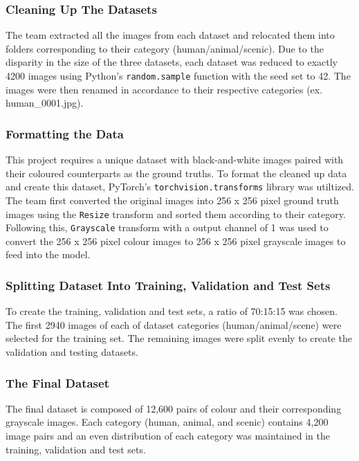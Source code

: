 \documentclass{article} %
\begin{document}
\subsubsection{Cleaning Up The Datasets}
The team extracted all the images from each dataset and relocated them into folders corresponding to their category (human/animal/scenic). Due to the disparity in the size of the three datasets, each dataset was reduced to exactly 4200 images using Python’s \verb|random.sample| function with the seed set to 42. The images were then renamed in accordance to their respective categories (ex. human\_0001.jpg). 

\subsubsection{Formatting the Data}

This project requires a unique dataset with black-and-white images paired with their coloured counterparts as the ground truths. To format the cleaned up data and create this dataset, PyTorch’s \verb|torchvision.transforms| library was utiltized. The team first converted the original images into 256 x 256 pixel ground truth images using the \verb|Resize| transform and sorted them according to their category. Following this, \verb|Grayscale| transform with a output channel of 1 was used to convert the 256 x 256 pixel colour images to 256 x 256 pixel grayscale images to feed into the model. 

 \subsubsection{Splitting Dataset Into Training, Validation and Test Sets}

To create the training, validation and test sets, a ratio of 70:15:15 was chosen. The first 2940 images of each of dataset categories (human/animal/scene) were selected for the training set. The remaining images were split evenly to create the validation and testing datasets. 

\subsubsection{The Final Dataset}

The final dataset is composed of 12,600 pairs of colour and their corresponding grayscale images. Each category (human, animal, and scenic) contains 4,200 image pairs and an even distribution of each category was maintained in the training, validation and test sets.
\end{document}
